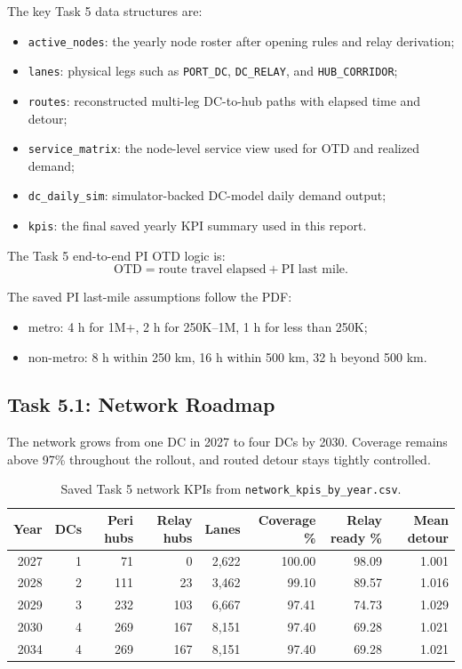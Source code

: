 \documentclass[11pt]{article}
\begin{document}
The key Task 5 data structures are:
\begin{itemize}
  \item \texttt{active\_nodes}: the yearly node roster after opening rules and relay derivation;
  \item \texttt{lanes}: physical legs such as \texttt{PORT\_DC}, \texttt{DC\_RELAY}, and
  \texttt{HUB\_CORRIDOR};
  \item \texttt{routes}: reconstructed multi-leg DC-to-hub paths with elapsed time and detour;
  \item \texttt{service\_matrix}: the node-level service view used for OTD and realized demand;
  \item \texttt{dc\_daily\_sim}: simulator-backed DC-model daily demand output;
  \item \texttt{kpis}: the final saved yearly KPI summary used in this report.
\end{itemize}

The Task 5 end-to-end PI OTD logic is:
\[
\text{OTD} = \text{route travel elapsed} + \text{PI last mile}.
\]

The saved PI last-mile assumptions follow the PDF:
\begin{itemize}
  \item metro: 4 h for 1M+, 2 h for 250K--1M, 1 h for less than 250K;
  \item non-metro: 8 h within 250 km, 16 h within 500 km, 32 h beyond 500 km.
\end{itemize}

\subsection{Task 5.1: Network Roadmap}

The network grows from one DC in 2027 to four DCs by 2030. Coverage remains above 97\%
throughout the rollout, and routed detour stays tightly controlled.

\begin{table}[H]
\centering
\small
\begin{tabular}{rrrrrrrr}
\toprule
Year & DCs & Peri hubs & Relay hubs & Lanes & Coverage \% & Relay ready \% & Mean detour \\
\midrule
2027 & 1 & 71 & 0 & 2,622 & 100.00 & 98.09 & 1.001 \\
2028 & 2 & 111 & 23 & 3,462 & 99.10 & 89.57 & 1.016 \\
2029 & 3 & 232 & 103 & 6,667 & 97.41 & 74.73 & 1.029 \\
2030 & 4 & 269 & 167 & 8,151 & 97.40 & 69.28 & 1.021 \\
2034 & 4 & 269 & 167 & 8,151 & 97.40 & 69.28 & 1.021 \\
\bottomrule
\end{tabular}
\caption{Saved Task 5 network KPIs from \texttt{network\_kpis\_by\_year.csv}.}
\end{table}
\end{document}
